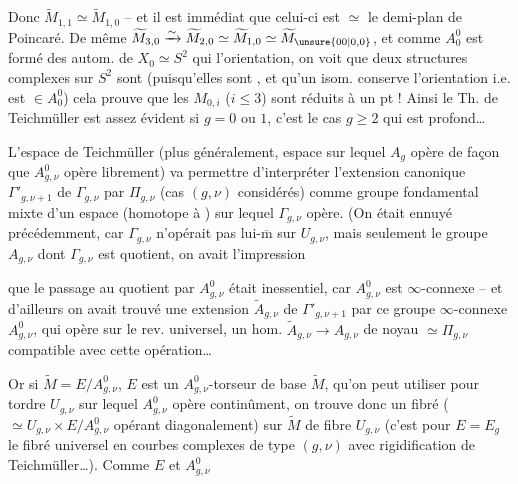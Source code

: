 Donc $\widetilde M_{1,1}\simeq\widetilde M_{1,0}$ -- et il est immédiat que celui-ci est $\simeq$ le demi-plan de Poincaré. De même
$\widetilde M_{3,0}\xrightarrow{\sim}\widetilde M_{2,0}\simeq\widetilde M_{1,0}\simeq\widetilde M_{\unsure{00|0,0}}$,
et comme $A_0^0$ est  formé des autom. de $X_0\simeq S^2$ qui  l'orientation, on voit que deux structures complexes sur $S^2$ sont  (puisqu'elles sont , et qu'un isom. conserve l'orientation i.e. est $\in A_0^0$) cela prouve que les $M_{0,i}$ ($i\leq 3$) sont réduits à un pt ! Ainsi le Th. de Teichmüller est assez évident si $g=0$ ou $1$, c'est le cas $g\geq 2$ qui est profond\ldots

L'espace de Teichmüller (plus généralement,  espace  sur lequel $A_g$ opère de façon que $A_{g,\nu}^0$ opère librement) va permettre d'interpréter l'extension canonique $\Gamma'_{g,\nu+1}$ de $\Gamma_{g,\nu}$ par $\Pi_{g,\nu}$ (cas $(g,\nu)$ considérés) comme groupe fondamental mixte d'un espace  (homotope à ) sur lequel $\Gamma_{g,\nu}$ opère. (On était ennuyé précédemment, car $\Gamma_{g,\nu}$ n'opérait pas lui-$\overline{\mathrm m}$ sur $U_{g,\nu}$, mais seulement le groupe $A_{g,\nu}$ dont $\Gamma_{g,\nu}$ est quotient, on avait l'impression

que le passage au quotient par $A_{g,\nu}^0$ était  inessentiel, car $A_{g,\nu}^0$ est $\infty$-connexe -- et d'ailleurs on avait trouvé une extension $\widetilde A_{g,\nu}$ de $\Gamma'_{g,\nu+1}$ par ce  groupe $\infty$-connexe $A_{g,\nu}^0$, qui opère sur le rev. universel,    un hom.  $\widetilde A_{g,\nu}\to A_{g,\nu}$ de noyau $\simeq\Pi_{g,\nu}$ compatible avec cette opération\ldots

Or si $\widetilde M=E/A_{g,\nu}^0$, $E$ est un $A_{g,\nu}^0$-torseur de base $\widetilde M$, qu'on peut utiliser pour tordre  $U_{g,\nu}$ sur lequel $A_{g,\nu}^0$ opère continûment, on trouve donc un fibré  ($\simeq U_{g,\nu}\times E/A_{g,\nu}^0$ opérant diagonalement) sur $\widetilde M$ de fibre $U_{g,\nu}$ (c'est pour $E=E_g$ le fibré universel en courbes complexes de type $(g,\nu)$ avec rigidification de Teichmüller\ldots). Comme $E$ et $A_{g,\nu}^0$

